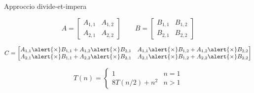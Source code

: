 \begin{frame}{Approccio divide-et-impera}

\vspace{-9pt}
\small
{}

\[
A = 
\begin{bmatrix} 
A_{1,1} & A_{1,2}\\	
A_{2,1} & A_{2,2} 
\end{bmatrix}
\qquad
B = 
\begin{bmatrix} 
B_{1,1} & B_{1,2}\\	
B_{2,1} & B_{2,2} 
\end{bmatrix}
\]

\medskip
{}

\[
C = 
\begin{bmatrix} 
A_{1,1} \alert{\times} B_{1,1} + A_{1,2} \alert{\times} B_{2,1} & A_{1,1} \alert{\times} B_{1,2} + A_{1,2} \alert{\times} B_{2,2} \\
A_{2,1} \alert{\times} B_{1,1} + A_{2,2} \alert{\times} B_{2,1} & A_{2,1} \alert{\times} B_{1,2} + A_{2,2} \alert{\times} B_{2,2} \\
\end{bmatrix}
\]

\medskip
{}

\[
T(n) = \left\{ 
  \begin{array}{ll}
     1 & n = 1\\
     8T(n/2) + n^2  & n > 1 
  \end{array} 
\right.
\]

\end{frame}

